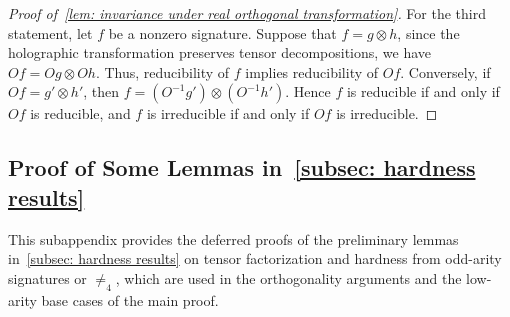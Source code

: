 \begin{proof}[Proof of~\cref{lem: invariance under real orthogonal transformation}]
For the third statement, let $f$ be a nonzero signature. Suppose that $f=g\otimes h$, since the holographic transformation preserves tensor decompositions, we have $Of=Og\otimes Oh$. Thus, reducibility of $f$ implies reducibility of $Of$. Conversely, if $Of=g'\otimes h'$, then $f=(O^{-1}g')\otimes (O^{-1} h')$. Hence $f$ is reducible if and only if $Of$ is reducible, and $f$ is irreducible if and only if $Of$ is irreducible.
\end{proof}

\subsection{Proof of Some Lemmas in~\cref{subsec: hardness results}}
This subappendix provides the deferred proofs of the preliminary lemmas in~\cref{subsec: hardness results}
on tensor factorization and hardness from odd-arity signatures or
$\neq_4$, which are used in the orthogonality arguments and the
low-arity base cases of the main proof.


